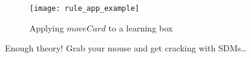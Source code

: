 \begin{figure}[htp] 
\begin{center}
  \texttt{[image: rule\_app\_example]}
  \caption[]{Applying $moveCard$ to a learning box}
  \label{fig:rule_app_example}
\end{center}
\end{figure}

\vspace*{1cm}

Enough theory! Grab your mouse and get cracking with SDMs\ldots
